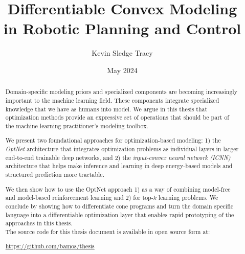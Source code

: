 \documentclass[12pt]{cmuthesis}
\begin{document}
\frontmatter

\pagestyle{empty}

\title{{\bf Differentiable Convex Modeling \\in Robotic Planning and Control}}
\author{Kevin Sledge Tracy}
\date{May 2024}


\support{}
\disclaimer{}


\maketitle


\begin{abstract}
  Domain-specific modeling priors and specialized components are
  becoming increasingly important to the machine learning field.
  These components integrate specialized knowledge that we have
  as humans into model.
  We argue in this thesis that optimization methods provide an
  expressive set of operations that should be part of the
  machine learning practitioner's modeling toolbox.

  We present two foundational approaches for optimization-based modeling:
  1) the \emph{OptNet} architecture that integrates
  optimization problems as individual layers in larger end-to-end
  trainable deep networks, and
  2) the \emph{input-convex neural network (ICNN)}
  architecture that helps make inference and learning in deep
  energy-based models and structured prediction more tractable.

  We then show how to use the OptNet approach
  1) as a way of combining model-free and model-based reinforcement
  learning and
  2) for top-$k$ learning problems.
  We conclude by showing how to differentiate cone programs
  and turn the \cvxpy domain specific language into
  a differentiable optimization layer that enables rapid prototyping of
  the approaches in this thesis. \\

  \noindent
  The source code for this thesis document is available in open source form at:
  \begin{center}
  \url{https://github.com/bamos/thesis}
  \end{center}
\end{abstract}
\end{document}
